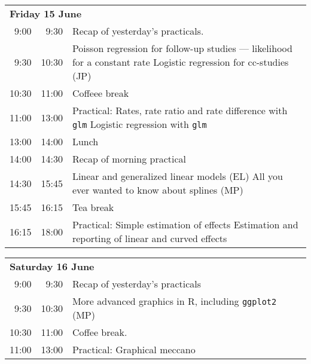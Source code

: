 \noindent
\begin{tabular}{r@{ -- }rp{13cm}}
\multicolumn{3}{l}{\bf Friday 15 June} \\
 9:00 &  9:30 & Recap of yesterday's practicals. \\
 9:30 & 10:30 & Poisson regression for follow-up studies ---
                likelihood for a constant rate \newline
                Logistic regression for cc-studies (JP) \\
10:30 & 11:00 & Coffeee break \\
11:00 & 13:00 & Practical: Rates, rate ratio and rate difference with \texttt{glm}\newline
                Logistic regression with \texttt{glm} \\
13:00 & 14:00 & Lunch \\
14:00 & 14:30 & Recap of morning practical \\
14:30 & 15:45 & Linear and generalized linear models (EL) \newline
                All you ever wanted to know about splines (MP) \\
15:45 & 16:15 & Tea break\\
16:15 & 18:00 & Practical: Simple estimation of effects \newline
                Estimation and reporting of linear and curved effects \\[1em]
\end{tabular}

\noindent
\begin{tabular}{r@{ -- }rp{13cm}}
 \multicolumn{3}{l}{\bf Saturday 16 June} \\
 9:00 &  9:30 & Recap of yesterday's practicals \\
 9:30 & 10:30 & More advanced graphics in R, including \texttt{ggplot2} (MP)\\
10:30 & 11:00 & Coffee break. \\
11:00 & 13:00 & Practical: Graphical meccano \\[1em]
\end{tabular}

